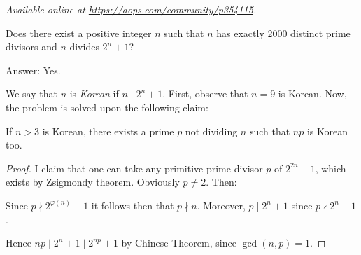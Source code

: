 \textsl{Available online at \url{https://aops.com/community/p354115}.}
\begin{mdframed}[style=mdpurplebox,frametitle={Problem statement}]
Does there exist a positive integer $n$
such that $n$ has exactly 2000 distinct prime divisors
and $n$ divides $2^n + 1$?
\end{mdframed}
Answer: Yes.

We say that $n$ is \emph{Korean} if $n \mid 2^n+1$.
First, observe that $n=9$ is Korean.
Now, the problem is solved upon the following claim:
\begin{claim*}
  If $n > 3$ is Korean,
  there exists a prime $p$ not dividing $n$
  such that $np$ is Korean too.
\end{claim*}
\begin{proof}
  I claim that one can take any primitive prime divisor $p$ of $2^{2n}-1$,
  which exists by Zsigmondy theorem.
  Obviously $p \neq 2$.
  Then:
  \begin{itemize}
    \ii Since $p \nmid 2^{\varphi(n)}-1$ it follows then that $p \nmid n$.
    \ii Moreover, $p \mid 2^n+1$ since $p \nmid 2^n-1$.
  \end{itemize}
  Hence $np \mid 2^n+1 \mid 2^{np} + 1$ by Chinese Theorem,
  since $\gcd(n,p) = 1$.
\end{proof}
\pagebreak